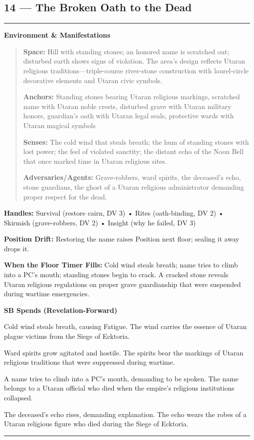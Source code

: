 \documentclass[18pt, letterpaper, twoside]{article}
\newenvironment{floorbox}[1]{%
    \begin{center}
    \begin{minipage}{0.95\textwidth}
    \subsection*{#1}
    \vspace{-0.5em}
    \rule{\textwidth}{0.5pt}
    \vspace{0.5em}
}{%
    \vspace{0.5em}
    \rule{\textwidth}{0.5pt}
    \end{minipage}
    \end{center}
}
\newenvironment{gmnote}[1]{%
    \vspace{0.5em}
    \noindent\textbf{#1}
    \begin{quote}
}{%
    \end{quote}
    \vspace{0.5em}
}
\newcommand{\handles}[1]{\noindent\textbf{Handles:} #1\par}
\newcommand{\sbitem}[2]{\item[#1 SB:] #2}
\begin{document}
\begin{floorbox}{14 --- The Broken Oath to the Dead}
\begin{gmnote}{Environment \& Manifestations}
\textbf{Space:} Hill with standing stones; an honored name is scratched out; disturbed earth shows signs of violation. The area's design reflects Utaran religious traditions---triple-course river-stone construction with laurel-circle decorative elements and Utaran civic symbols.

\textbf{Anchors:} Standing stones bearing Utaran religious markings, scratched name with Utaran noble crests, disturbed grave with Utaran military honors, guardian's oath with Utaran legal seals, protective wards with Utaran magical symbols

\textbf{Senses:} The cold wind that steals breath; the hum of standing stones with lost power; the feel of violated sanctity; the distant echo of the Noon Bell that once marked time in Utaran religious sites.

\textbf{Adversaries/Agents:} Grave-robbers, ward spirits, the deceased's echo, stone guardians, the ghost of a Utaran religious administrator demanding proper respect for the dead.
\end{gmnote}

\handles{Survival (restore cairn, DV 3) • Rites (oath-binding, DV 2) • Skirmish (grave-robbers, DV 2) • Insight (why he failed, DV 3)}

\textbf{Position Drift:} Restoring the name raises Position next floor; sealing it away drops it.

\textbf{When the Floor Timer Fills:} Cold wind steals breath; name tries to climb into a PC's mouth; standing stones begin to crack. A cracked stone reveals Utaran religious regulations on proper grave guardianship that were suspended during wartime emergencies.

\textbf{SB Spends (Revelation-Forward)}
\begin{description}[leftmargin=*, style=unboxed]
    \sbitem{1}{Cold wind steals breath, causing Fatigue. The wind carries the essence of Utaran plague victims from the Siege of Ecktoria.}
    \sbitem{2}{Ward spirits grow agitated and hostile. The spirits bear the markings of Utaran religious traditions that were suppressed during wartime.}
    \sbitem{3}{A name tries to climb into a PC's mouth, demanding to be spoken. The name belongs to a Utaran official who died when the empire's religious institutions collapsed.}
    \sbitem{4+}{The deceased's echo rises, demanding explanation. The echo wears the robes of a Utaran religious figure who died during the Siege of Ecktoria.}
\end{description}


\end{floorbox}
\end{document}
